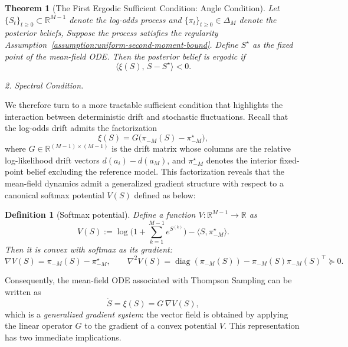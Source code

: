 \documentclass[12pt]{article}
\newtheorem{definition}{Definition}
\newtheorem{theorem}{Theorem}
\begin{document}
\begin{theorem}[The First Ergodic Sufficient Condition: Angle Condition]\label{thm:ergodicity-angle-condition}
Let $\{S_t\}_{t\ge0}\subset \mathbb{R}^{M-1}$ denote the log-odds process and $\{\pi_t\}_{t \geq 0} \in \Delta_M$ denote the posterior beliefs, Suppose the process satisfies the regularity Assumption~\ref{assumption:uniform-second-moment-bound}.
Define $S^\star$ as the fixed point of the mean-field ODE. Then the posterior belief is ergodic if
\begin{equation}\label{eq:angle-condition}
\big\langle \xi(S), \, S - S^\star \big\rangle < 0.
\end{equation}
\end{theorem}

\vspace{0.5em}
\textit{2. Spectral Condition.}

We therefore turn to a more tractable sufficient condition that highlights the interaction between deterministic drift and stochastic fluctuations. Recall that the log-odds drift admits the factorization
\begin{equation}
\xi(S)
= G\big(\pi_{-M}(S)-\pi_{-M}^\star\big),
\label{eq:xi-factor-main}
\end{equation}
where $G\in\mathbb{R}^{(M-1)\times(M-1)}$ is the drift matrix whose columns are the relative log-likelihood drift vectors $d(a_i)-d(a_M)$, and $\pi_{-M}^\star$ denotes the interior fixed-point belief excluding the reference model. This factorization reveals that the mean-field dynamics admit a generalized gradient structure with respect to a canonical softmax potential $V(S)$ defined as below:

\begin{definition}[Softmax potential]
\label{def:softmax-potential-main}
Define a function $V:\mathbb{R}^{M-1}\to\mathbb{R}$ as
\begin{equation}
V(S) := \log\!\Big(1+\sum_{k=1}^{M-1} e^{S^{(k)}}\Big)-\langle S,\pi_{-M}^\star\rangle .
\end{equation}
Then it is convex with softmax as its gradient:
\[
\nabla V(S)=\pi_{-M}(S)-\pi_{-M}^\star,
\qquad
\nabla^2 V(S)
= \operatorname{diag}(\pi_{-M}(S))-\pi_{-M}(S)\pi_{-M}(S)^\top \succeq 0 .
\]
\end{definition}

Consequently, the mean-field ODE associated with Thompson Sampling can be written as
\begin{equation}
\dot S = \xi(S) = G\,\nabla V(S),
\label{eq:generalized-gradient-ode}
\end{equation}
which is a \emph{generalized gradient system}: the vector field is obtained by applying the linear operator $G$ to the gradient of a convex potential $V$. This representation has two immediate implications.
\end{document}
